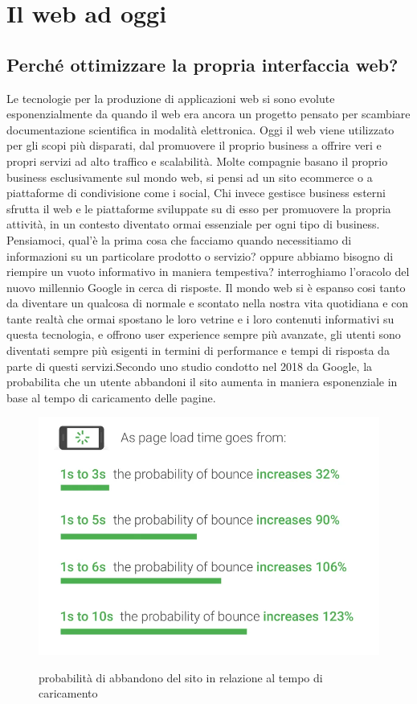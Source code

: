 \chapter{Il web ad oggi}
\section{Perché ottimizzare la propria interfaccia web?}
Le tecnologie per la produzione di applicazioni web si sono evolute esponenzialmente da quando il web era ancora un progetto pensato per scambiare documentazione scientifica in modalità elettronica. Oggi il web viene utilizzato per gli scopi più disparati, dal promuovere il proprio business a offrire veri e propri servizi ad alto traffico e scalabilità.
Molte compagnie basano il proprio business esclusivamente sul mondo web, si pensi ad un sito ecommerce o a piattaforme di condivisione come i social, Chi invece gestisce business esterni sfrutta il web e le piattaforme sviluppate su di esso per promuovere la propria attività, in un contesto diventato ormai essenziale per ogni tipo di business.
\newline
Pensiamoci, qual'è  la prima cosa che facciamo quando necessitiamo di informazioni su un particolare prodotto o servizio? oppure abbiamo bisogno di riempire un vuoto informativo in maniera tempestiva?  interroghiamo l'oracolo del nuovo millennio Google in cerca di risposte.
\newline
Il mondo web si è espanso cosi tanto da diventare un qualcosa di normale e scontato nella nostra vita quotidiana e con tante realtà che ormai spostano le loro vetrine e i loro contenuti informativi su questa tecnologia, e offrono user experience sempre più avanzate, gli utenti sono diventati sempre più esigenti in termini di performance e tempi di risposta da parte di questi servizi.Secondo uno studio condotto nel 2018 da Google, la probabilita che un utente abbandoni il sito aumenta in maniera esponenziale in base al tempo di caricamento delle pagine.\cite{mobile-page-speed}
\newline
\begin{figure}[H]
\centering
   \includegraphics[scale=0.5]{resources/mobile-page-speed-new-industry.png}
\cite{mobile-page-speed}
\caption{probabilità di abbandono del sito in relazione al tempo di caricamento}
\end{figure}

